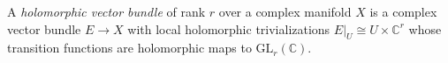 
A \emph{holomorphic vector bundle} of rank $r$ over a complex manifold $X$ is a complex vector bundle $E\to X$ with local holomorphic trivializations $E|_U\cong U\times\mathbb C^r$ whose transition functions are holomorphic maps to $\mathrm{GL}_r(\mathbb C)$.
